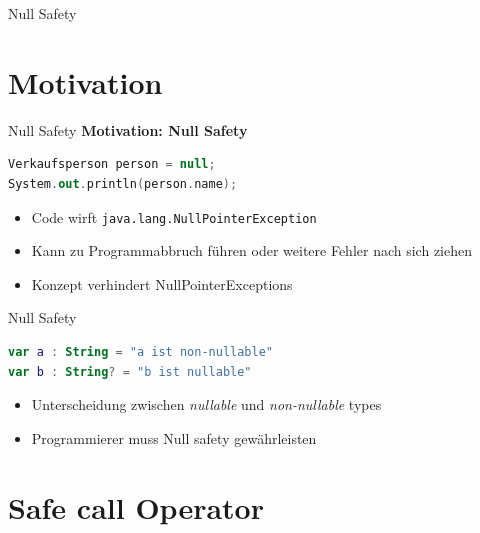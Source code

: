 \documentclass{beamer}
\begin{document}



\begin{frame}{Null Safety}
  \tableofcontents[sections={5-9}]
\end{frame}

\section{Motivation}

\begin{frame}[fragile]{Null Safety}
  \textbf{Motivation: Null Safety}
  \pause\vspace{0.5cm}
  \begin{lstlisting}[language=Kotlin, title=Java Beispiel, xleftmargin=1em]
Verkaufsperson person = null;
System.out.println(person.name);
  \end{lstlisting}
  \pause\vspace{1cm}
  \begin{itemize}[<+->]
    \item Code wirft \texttt{java.lang.NullPointerException}
    \item Kann zu Programmabbruch führen oder weitere Fehler nach sich ziehen
    \item Konzept verhindert NullPointerExceptions
  \end{itemize}
\end{frame}

\begin{frame}[fragile]{Null Safety}
  \begin{lstlisting}[language=Kotlin]
var a : String = "a ist non-nullable"
var b : String? = "b ist nullable"
  \end{lstlisting}
  \pause \vspace{1cm}
  \begin{itemize}[<+->]
    \item Unterscheidung zwischen \textit{nullable} und \textit{non-nullable} types
    \item Programmierer muss Null safety gewährleisten
  \end{itemize}
\end{frame}

\section{Safe call Operator}
\end{document}
